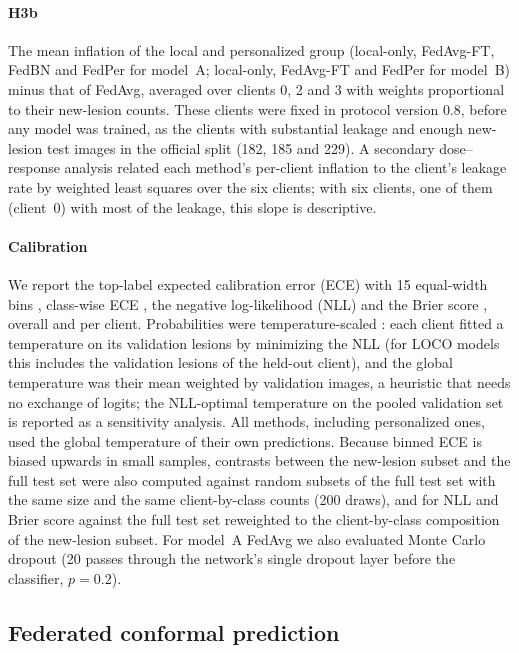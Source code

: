 \documentclass[VANCOUVER,Times1COL]{WileyNJDv5}
\begin{document}
\paragraph{H3b} The mean inflation of the local and personalized group (local-only, FedAvg-FT, FedBN
and FedPer for model~A; local-only, FedAvg-FT and FedPer for model~B) minus that of FedAvg, averaged over
clients 0, 2 and 3 with weights proportional to their new-lesion counts. These clients were fixed in
protocol version 0.8, before any model was trained, as the clients with substantial leakage and enough
new-lesion test images in the official split (182, 185 and 229). A secondary dose--response analysis related each
method's per-client inflation to the client's leakage rate by weighted least squares over the six clients;
with six clients, one of them (client~0) with most of the leakage, this slope is descriptive.

\paragraph{Calibration} We report the top-label expected calibration error (ECE) with 15 equal-width
bins \cite{naeini2015ece,guo2017calibration}, class-wise ECE \cite{kull2019beyond}, the negative
log-likelihood (NLL) and the Brier score \cite{brier1950}, overall and per client. Probabilities were
temperature-scaled \cite{guo2017calibration}: each client fitted a temperature on its validation lesions by minimizing the NLL (for LOCO models this includes the validation lesions of the held-out client), and the global temperature was their mean weighted by validation images, a
heuristic that needs no exchange of logits; the NLL-optimal temperature on the pooled validation set is
reported as a sensitivity analysis. All methods, including personalized ones, used the global temperature
of their own predictions. Because binned ECE is biased upwards in small samples, contrasts between the
new-lesion subset and the full test set were also computed against random subsets of the full test set
with the same size and the same client-by-class counts (200 draws), and for NLL and Brier score against
the full test set reweighted to the client-by-class composition of the new-lesion subset. For model~A
FedAvg we also evaluated Monte Carlo dropout \cite{gal2016dropout} (20 passes through the network's single
dropout layer before the classifier, $p=0.2$).

\subsection{Federated conformal prediction}
\label{sec:conformal}
\end{document}
